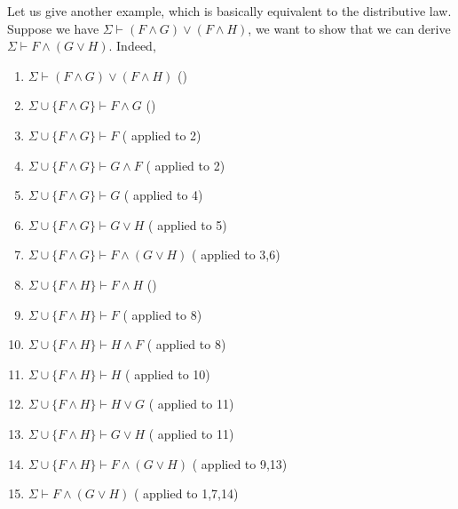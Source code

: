 \begin{prooftree}
\end{prooftree}

\begin{prooftree}
\end{prooftree}

\begin{prooftree}
\end{prooftree}

Let us give another example, which is basically equivalent to the distributive law. Suppose we have $\Sigma\vdash (F\wedge G)\vee(F\wedge H)$, we want to show that we can derive $\Sigma\vdash F\wedge(G\vee H)$. Indeed,
\begin{enumerate}
	\item $\Sigma\vdash (F\wedge G)\vee(F\wedge H)$ \hfill ()%
	
	\item $\Sigma\cup\{F\wedge G\} \vdash F\wedge G$ \hfill ()%
	\item $\Sigma\cup\{F\wedge G\} \vdash F$ \hfill ( applied to 2)%
	\item $\Sigma\cup\{F\wedge G\} \vdash G\wedge F$ \hfill ( applied to 2)%
	\item $\Sigma\cup\{F\wedge G\} \vdash G$ \hfill ( applied to 4)%
	\item $\Sigma\cup\{F\wedge G\}\vdash G\vee H$ \hfill ( applied to 5)%
	\item $\Sigma\cup\{F\wedge G\}\vdash F\wedge(G\vee H)$ \hfill ( applied to 3,6)%

	\item $\Sigma\cup\{F\wedge H\} \vdash F\wedge H$ \hfill ()%
	\item $\Sigma\cup\{F\wedge H\} \vdash F$ \hfill ( applied to 8)%
	\item $\Sigma\cup\{F\wedge H\} \vdash H\wedge F$ \hfill ( applied to 8)%
	\item $\Sigma\cup\{F\wedge H\} \vdash H$ \hfill ( applied to 10)%
	\item $\Sigma\cup\{F\wedge H\}\vdash H\vee G$ \hfill ( applied to 11)%
	\item $\Sigma\cup\{F\wedge H\}\vdash G\vee H$ \hfill ( applied to 11)%
	\item $\Sigma\cup\{F\wedge H\}\vdash F\wedge(G\vee H)$ \hfill ( applied to 9,13)%

	\item $\Sigma\vdash F\wedge(G\vee H)$ \hfill ( applied to 1,7,14)%
\end{enumerate}

